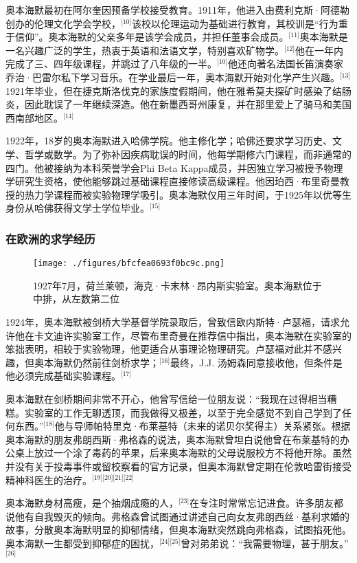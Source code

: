 奥本海默最初在阿尔奎因预备学校接受教育。1911年，他进入由费利克斯·阿德勒创办的伦理文化学会学校，\(^\text{[10]}\)该校以伦理运动为基础进行教育，其校训是“行为重于信仰”。奥本海默的父亲多年是该学会成员，并担任董事会成员。\(^\text{[11]}\)奥本海默是一名兴趣广泛的学生，热衷于英语和法语文学，特别喜欢矿物学。\(^\text{[12]}\)他在一年内完成了三、四年级课程，并跳过了八年级的一半。\(^\text{[10]}\)他还向著名法国长笛演奏家乔治·巴雷尔私下学习音乐。在学业最后一年，奥本海默开始对化学产生兴趣。\(^\text{[13]}\)1921年毕业，但在捷克斯洛伐克的家族度假期间，他在雅希莫夫探矿时感染了结肠炎，因此耽误了一年继续深造。他在新墨西哥州康复，并在那里爱上了骑马和美国西南部地区。\(^\text{[14]}\)

1922年，18岁的奥本海默进入哈佛学院。他主修化学；哈佛还要求学习历史、文学、哲学或数学。为了弥补因疾病耽误的时间，他每学期修六门课程，而非通常的四门。他被接纳为本科荣誉学会Phi Beta Kappa成员，并因独立学习被授予物理学研究生资格，使他能够跳过基础课程直接修读高级课程。他因珀西·布里奇曼教授的热力学课程而被实验物理学吸引。奥本海默仅用三年时间，于1925年以优等生身份从哈佛获得文学士学位毕业。\(^\text{[15]}\)
\subsubsection{在欧洲的求学经历}
\begin{figure}[ht]
\centering
\texttt{[image: ./figures/bfcfea0693f0bc9c.png]}
\caption{1927年7月，荷兰莱顿，海克·卡末林·昂内斯实验室。奥本海默位于中排，从左数第二位} \label{fig_ABHM_2}
\end{figure}
1924年，奥本海默被剑桥大学基督学院录取后，曾致信欧内斯特·卢瑟福，请求允许他在卡文迪许实验室工作，尽管布里奇曼在推荐信中指出，奥本海默在实验室的笨拙表明，相较于实验物理，他更适合从事理论物理研究。卢瑟福对此并不感兴趣，但奥本海默仍然前往剑桥求学；\(^\text{[16]}\)最终，J.J. 汤姆森同意接收他，但条件是他必须完成基础实验课程。\(^\text{[17]}\)

奥本海默在剑桥期间非常不开心，他曾写信给一位朋友说：“我现在过得相当糟糕。实验室的工作无聊透顶，而我做得又极差，以至于完全感觉不到自己学到了任何东西。”\(^\text{[18]}\)他与导师帕特里克·布莱基特（未来的诺贝尔奖得主）关系紧张。根据奥本海默的朋友弗朗西斯·弗格森的说法，奥本海默曾坦白说他曾在布莱基特的办公桌上放过一个涂了毒药的苹果，后来奥本海默的父母说服校方不将他开除。虽然并没有关于投毒事件或留校察看的官方记录，但奥本海默曾定期在伦敦哈雷街接受精神科医生的治疗。\(^\text{[19][20][21][22]}\)

奥本海默身材高瘦，是个抽烟成瘾的人，\(^\text{[23]}\)在专注时常常忘记进食。许多朋友都说他有自我毁灭的倾向。弗格森曾试图通过讲述自己向女友弗朗西丝·基利求婚的故事，分散奥本海默明显的抑郁情绪，但奥本海默突然跳向弗格森，试图掐死他。奥本海默一生都受到抑郁症的困扰，\(^\text{[24][25]}\)曾对弟弟说：“我需要物理，甚于朋友。”\(^\text{[26]}\)

